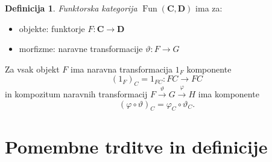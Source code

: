 \documentclass[12pt,a4paper]{book}
\theoremstyle{definition}
\newtheorem{definicija}{Definicija}[chapter]
\theoremstyle{plain}
\theoremstyle{definition}
\theoremstyle{remark}
\newcommand{\cat}[1]{\textbf{#1}}
\DeclareMathOperator{\Fun}{Fun}
\begin{document}
\begin{definicija}
\emph{Funktorska kategorija} $\Fun(\cat{C}, \cat{D})$ ima za:
\begin{itemize}
\item objekte: funktorje $F : \cat{C} \to \cat{D}$
\item morfizme: naravne transformacije $\vartheta : F \to G$
\end{itemize}
Za vsak objekt $F$ ima naravna transformacija $1_F$ komponente
$$ (1_F)_C = 1_{FC} : FC \to FC$$
in kompozitum naravnih transformacij $F \xrightarrow{\vartheta} G \xrightarrow{\varphi} H$
ima komponente
$$ (\varphi \circ \vartheta)_C = \varphi_C \circ \vartheta_C.$$
\end{definicija}



\chapter{Pomembne trditve in definicije}
\end{document}
